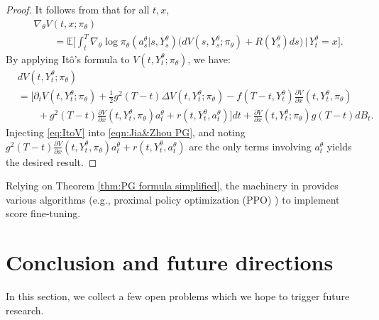 \documentclass[letterpaper,11pt,reqno]{amsart}
\numberwithin{equation}{section}
\begin{document}
\begin{proof}
It follows from \cite[Theorem 5]{Jia22} that for all $t,x$,
\begin{equation}
\label{eqn:Jia&Zhou PG}
\begin{aligned}
& \nabla_\theta V(t, x ; \pi_\theta) \\
& \qquad =  \mathbb{E}\bigg[\int_t ^ { T }\nabla_\theta \log \pi_{ \theta} ( a _ {s} ^ {\theta} | s , Y _ { s } ^ { \theta } ) \bigg(d V(s, Y_s^{\theta} ; \pi_\theta) +R(Y_s^{\theta}) d s\bigg)  \, \bigg| \, Y_t^{\theta}=x\bigg].
\end{aligned}
\end{equation}
By applying It\^o's formula to $V(t, Y^\theta_t; \pi_\theta)$, we have:
\begin{equation}
\label{eq:ItoV}
\begin{aligned}
& d V(t, Y^\theta_t; \pi_{\theta}) \\
& = 
\bigg[ \partial_t V(t, Y^\theta_t; \pi_{\theta}) + \frac{1}{2} g^2(T-t) \Delta V(t, Y^\theta_t; \pi_{\theta}) - f(T-t, Y^\theta_t) \frac{\partial V}{\partial x}(t,Y^\theta_t, \pi_\theta) \\
& \qquad  + g^2(T-t)  \frac{\partial V}{\partial x}(t,Y^\theta_t, \pi_\theta)a_t^\theta  + r(t, Y^\theta_t, a^\theta_t) \bigg] dt 
+  \frac{\partial V}{\partial x}(t,Y^\theta_t; \pi_\theta)g(T-t) dB_t.
\end{aligned}
\end{equation}
Injecting \eqref{eq:ItoV} into \eqref{eqn:Jia&Zhou PG},
and noting 
$g^2(T-t)  \frac{\partial V}{\partial x}(t,Y^\theta_t, \pi_\theta)a_t^\theta  + r(t, Y^\theta_t, a^\theta_t)$
are the only terms involving $a_t^{\theta}$ yields the desired result.
\end{proof}

\quad Relying on Theorem \ref{thm:PG formula simplified}, the machinery in \cite{ZTY23}
provides various algorithms (e.g., proximal policy optimization (PPO) \cite{schulman2017}) to implement score fine-tuning.


\section{Conclusion and future directions}
\label{sc8}

\quad In this section, we collect a few open problems
which we hope to trigger future research.
\end{document}
